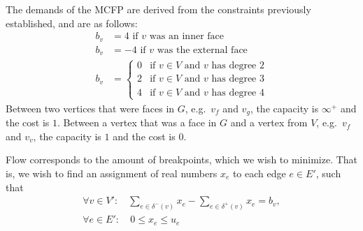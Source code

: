The demands of the MCFP are derived from the constraints previously established,
and are as follows:
%
\begin{align*}
  b_v &= 4 \text{ if $v$ was an inner face} \\
  b_v &= -4 \text{ if $v$ was the external face} \\
  b_v &= \begin{cases}
        0 & \text{if $v \in V$ and $v$ has degree 2}\\
        2 & \text{if $v \in V$ and $v$  has degree 3}\\
        4 & \text{if $v \in V$ and $v$  has degree 4}
      \end{cases}
\end{align*}
%
Between two vertices that were faces in $G$, e.g.\ $v_f$ and $v_g$, the
capacity is $\infty^+$ and the cost is $1$. Between a vertex that was a face
in $G$ and a vertex from $V$, e.g.\ $v_f$ and $v_v$, the capacity is $1$ and
the cost is $0$.

Flow corresponds to the amount of breakpoints, which we wish to minimize. That
is, we wish to find an assignment of real numbers $x_e$ to each edge $e \in E'$,
such that
%
\begin{align*}
  \forall v\in V': & \sum_{e \in \delta^-(v)} x_e - \sum_{e \in \delta^+(v)} x_e = b_v,\\
  \forall e\in E': & \ 0 \leq x_e \leq u_e
\end{align*}